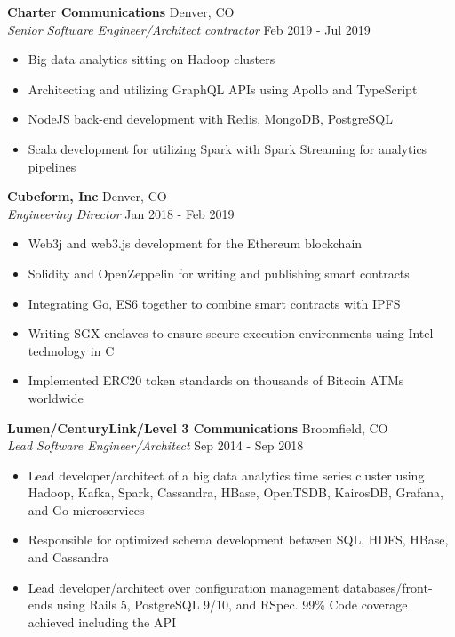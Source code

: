 \documentclass[a4paper]{article}
\begin{document}
{\begin{itemize}
\end{itemize}
\textbf{Charter Communications} \hfill Denver, CO\\
\textit{Senior Software Engineer/Architect contractor} \hfill Feb 2019 - Jul 2019\\
\vspace{-1mm}
\begin{itemize} \itemsep 1pt
	\item Big data analytics sitting on Hadoop clusters
	\item Architecting and utilizing GraphQL APIs using Apollo and TypeScript
	\item NodeJS back-end development with Redis, MongoDB, PostgreSQL
	\item Scala development for utilizing Spark with Spark Streaming for analytics pipelines
\end{itemize}
\textbf{Cubeform, Inc} \hfill Denver, CO\\
\textit{Engineering Director} \hfill Jan 2018 - Feb 2019\\
\vspace{-1mm}
\begin{itemize} \itemsep 1pt
	\item Web3j and web3.js development for the Ethereum blockchain
	\item Solidity and OpenZeppelin for writing and publishing smart contracts
	\item Integrating Go, ES6 together to combine smart contracts with IPFS
	\item Writing SGX enclaves to ensure secure execution environments using Intel technology in C
	\item Implemented ERC20 token standards on thousands of Bitcoin ATMs worldwide
\end{itemize}
\textbf{Lumen/CenturyLink/Level 3 Communications} \hfill Broomfield, CO\\
\textit{Lead Software Engineer/Architect} \hfill Sep 2014 - Sep 2018\\
\vspace{-1mm}
\begin{itemize} \itemsep 1pt
	\item Lead developer/architect of a big data analytics time series cluster using Hadoop, Kafka, Spark, Cassandra, HBase, OpenTSDB, KairosDB, Grafana, and Go microservices
	\item Responsible for optimized schema development between SQL, HDFS, HBase, and Cassandra
	\item Lead developer/architect over configuration management databases/front-ends using Rails 5, PostgreSQL 9/10, and RSpec. 99\% Code coverage achieved including the API

\end{itemize}}
\end{document}

